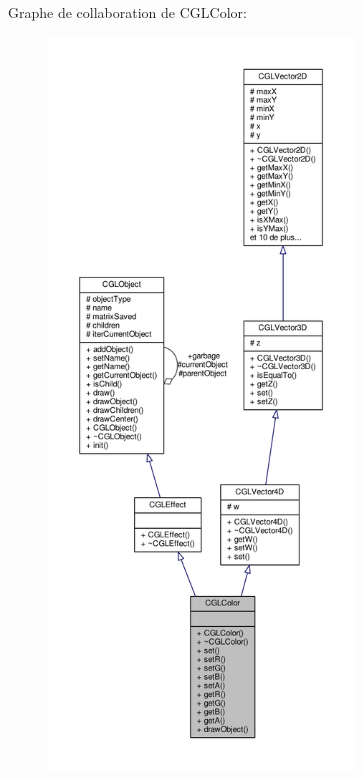 Graphe de collaboration de C\-G\-L\-Color\-:
\nopagebreak
\begin{figure}[H]
\begin{center}
\leavevmode
\includegraphics[height=550pt]{d0/d7c/class_c_g_l_color__coll__graph}
\end{center}
\end{figure}
